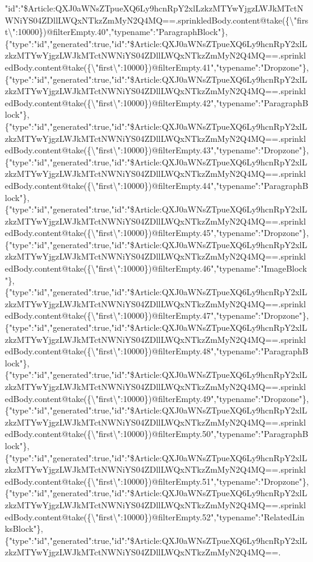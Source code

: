 "id":"\$Article:QXJ0aWNsZTpueXQ6Ly9hcnRpY2xlLzkzMTYwYjgzLWJkMTctNWNiYS04ZDllLWQxNTkzZmMyN2Q4MQ==.sprinkledBody.content@take(\{\textbackslash{}"first\textbackslash{}":10000\})@filterEmpty.40","typename":"ParagraphBlock"\},\{"type":"id","generated":true,"id":"\$Article:QXJ0aWNsZTpueXQ6Ly9hcnRpY2xlLzkzMTYwYjgzLWJkMTctNWNiYS04ZDllLWQxNTkzZmMyN2Q4MQ==.sprinkledBody.content@take(\{\textbackslash{}"first\textbackslash{}":10000\})@filterEmpty.41","typename":"Dropzone"\},\{"type":"id","generated":true,"id":"\$Article:QXJ0aWNsZTpueXQ6Ly9hcnRpY2xlLzkzMTYwYjgzLWJkMTctNWNiYS04ZDllLWQxNTkzZmMyN2Q4MQ==.sprinkledBody.content@take(\{\textbackslash{}"first\textbackslash{}":10000\})@filterEmpty.42","typename":"ParagraphBlock"\},\{"type":"id","generated":true,"id":"\$Article:QXJ0aWNsZTpueXQ6Ly9hcnRpY2xlLzkzMTYwYjgzLWJkMTctNWNiYS04ZDllLWQxNTkzZmMyN2Q4MQ==.sprinkledBody.content@take(\{\textbackslash{}"first\textbackslash{}":10000\})@filterEmpty.43","typename":"Dropzone"\},\{"type":"id","generated":true,"id":"\$Article:QXJ0aWNsZTpueXQ6Ly9hcnRpY2xlLzkzMTYwYjgzLWJkMTctNWNiYS04ZDllLWQxNTkzZmMyN2Q4MQ==.sprinkledBody.content@take(\{\textbackslash{}"first\textbackslash{}":10000\})@filterEmpty.44","typename":"ParagraphBlock"\},\{"type":"id","generated":true,"id":"\$Article:QXJ0aWNsZTpueXQ6Ly9hcnRpY2xlLzkzMTYwYjgzLWJkMTctNWNiYS04ZDllLWQxNTkzZmMyN2Q4MQ==.sprinkledBody.content@take(\{\textbackslash{}"first\textbackslash{}":10000\})@filterEmpty.45","typename":"Dropzone"\},\{"type":"id","generated":true,"id":"\$Article:QXJ0aWNsZTpueXQ6Ly9hcnRpY2xlLzkzMTYwYjgzLWJkMTctNWNiYS04ZDllLWQxNTkzZmMyN2Q4MQ==.sprinkledBody.content@take(\{\textbackslash{}"first\textbackslash{}":10000\})@filterEmpty.46","typename":"ImageBlock"\},\{"type":"id","generated":true,"id":"\$Article:QXJ0aWNsZTpueXQ6Ly9hcnRpY2xlLzkzMTYwYjgzLWJkMTctNWNiYS04ZDllLWQxNTkzZmMyN2Q4MQ==.sprinkledBody.content@take(\{\textbackslash{}"first\textbackslash{}":10000\})@filterEmpty.47","typename":"Dropzone"\},\{"type":"id","generated":true,"id":"\$Article:QXJ0aWNsZTpueXQ6Ly9hcnRpY2xlLzkzMTYwYjgzLWJkMTctNWNiYS04ZDllLWQxNTkzZmMyN2Q4MQ==.sprinkledBody.content@take(\{\textbackslash{}"first\textbackslash{}":10000\})@filterEmpty.48","typename":"ParagraphBlock"\},\{"type":"id","generated":true,"id":"\$Article:QXJ0aWNsZTpueXQ6Ly9hcnRpY2xlLzkzMTYwYjgzLWJkMTctNWNiYS04ZDllLWQxNTkzZmMyN2Q4MQ==.sprinkledBody.content@take(\{\textbackslash{}"first\textbackslash{}":10000\})@filterEmpty.49","typename":"Dropzone"\},\{"type":"id","generated":true,"id":"\$Article:QXJ0aWNsZTpueXQ6Ly9hcnRpY2xlLzkzMTYwYjgzLWJkMTctNWNiYS04ZDllLWQxNTkzZmMyN2Q4MQ==.sprinkledBody.content@take(\{\textbackslash{}"first\textbackslash{}":10000\})@filterEmpty.50","typename":"ParagraphBlock"\},\{"type":"id","generated":true,"id":"\$Article:QXJ0aWNsZTpueXQ6Ly9hcnRpY2xlLzkzMTYwYjgzLWJkMTctNWNiYS04ZDllLWQxNTkzZmMyN2Q4MQ==.sprinkledBody.content@take(\{\textbackslash{}"first\textbackslash{}":10000\})@filterEmpty.51","typename":"Dropzone"\},\{"type":"id","generated":true,"id":"\$Article:QXJ0aWNsZTpueXQ6Ly9hcnRpY2xlLzkzMTYwYjgzLWJkMTctNWNiYS04ZDllLWQxNTkzZmMyN2Q4MQ==.sprinkledBody.content@take(\{\textbackslash{}"first\textbackslash{}":10000\})@filterEmpty.52","typename":"RelatedLinksBlock"\},\{"type":"id","generated":true,"id":"\$Article:QXJ0aWNsZTpueXQ6Ly9hcnRpY2xlLzkzMTYwYjgzLWJkMTctNWNiYS04ZDllLWQxNTkzZmMyN2Q4MQ==.